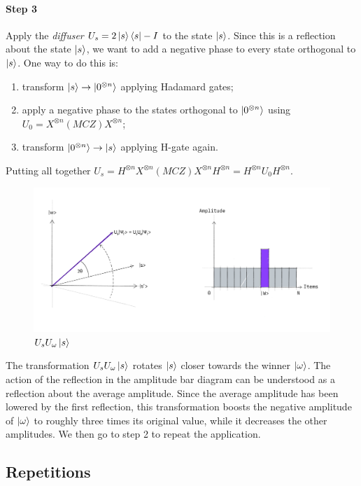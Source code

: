 \documentclass{article}
\begin{document}
\paragraph{Step 3}
Apply the \emph{diffuser} $U_s = 2\ket{s}\bra{s} -I$ to the state $\ket{s}$.
Since this is a reflection about the state $\ket{s}$, we want to add a negative
phase to every state orthogonal to $\ket{s}$.
One way to do this is:
\begin{enumerate}
  \item
  transform $\ket{s} \rightarrow \ket{0^{\otimes n}}$ applying Hadamard gates;
  \item
  apply a negative phase to the states orthogonal to $\ket{0^{\otimes n}}$
  using $U_0 =
  X^{\otimes n} (MCZ) X^{\otimes n}$;
  \item
  transform $\ket{0^{\otimes n}} \rightarrow \ket{s}$ applying H-gate again.
\end{enumerate}
Putting all together $U_s = H^{\otimes n} X^{\otimes n} (MCZ) X^{\otimes n}
H^{\otimes n} = H^{\otimes n} U_0 H^{\otimes n}$.
\begin{figure}[H]
  \centering
  \includegraphics[width=345pt]{Img/grover-step3.jpg}
  \caption{$U_s U_\omega \ket{s}$}
\end{figure}
The transformation $U_s U_\omega \ket{s}$ rotates $\ket{s}$
closer towards the winner $\ket{\omega}$.
The action of the reflection
in the amplitude bar diagram can be understood as a reflection about the
average amplitude. Since the average amplitude has been lowered by the first
reflection, this transformation boosts the negative amplitude of
$\ket{\omega}$ to roughly three times its original value, while it decreases
the other amplitudes. We then go to step 2 to repeat the application.

\subsection{Repetitions}
\end{document}
